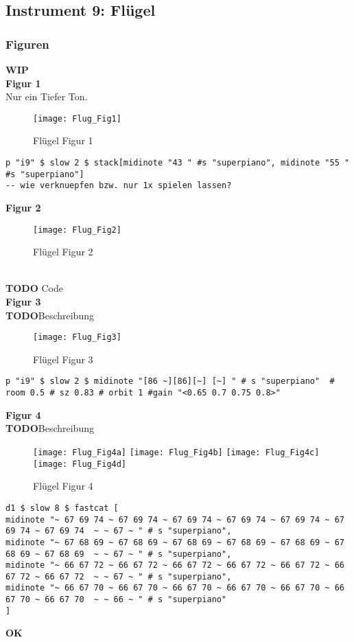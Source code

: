 \documentclass[
10pt, %
a4paper, %
oneside, %
headinclude,footinclude, %
BCOR5mm, %
]{scrartcl}
\begin{document}
\subsection{Instrument 9: Flügel}
\subsubsection{Figuren}
{\color{orange}\textbf{WIP}} \\
\noindent\textbf{Figur 1}\\
Nur ein Tiefer Ton.
\begin{figure}[h]
	\centering 
	\texttt{[image: Flug\_Fig1]} 
	\caption{Flügel Figur 1}
\end{figure}

\begin{lstlisting}
p "i9" $ slow 2 $ stack[midinote "43 " #s "superpiano", midinote "55 " #s "superpiano"]
-- wie verknuepfen bzw. nur 1x spielen lassen?
\end{lstlisting}

\noindent \textbf{Figur 2}\\
\begin{figure}[h]
	\centering 
	\texttt{[image: Flug\_Fig2]} 
	\caption{Flügel Figur 2}
\end{figure}\\
{\color{red}\textbf{TODO}} Code\\


\noindent \textbf{Figur 3}\\
{\color{red}\textbf{TODO}}Beschreibung\\
\begin{figure}[h]
	\centering 
	\texttt{[image: Flug\_Fig3]} 
	\caption{Flügel Figur 3}
\end{figure}
\begin{lstlisting}
p "i9" $ slow 2 $ midinote "[86 ~][86][~] [~] " # s "superpiano"  # room 0.5 # sz 0.83 # orbit 1 #gain "<0.65 0.7 0.75 0.8>"
\end{lstlisting}


\noindent \textbf{Figur 4}\\
{\color{red}\textbf{TODO}}Beschreibung\\
\begin{figure}[h]
	\centering 
	\texttt{[image: Flug\_Fig4a]} 
	\texttt{[image: Flug\_Fig4b]} 
	\texttt{[image: Flug\_Fig4c]} 
	\texttt{[image: Flug\_Fig4d]} 
	\caption{Flügel Figur 4}
\end{figure}
\begin{lstlisting}
d1 $ slow 8 $ fastcat [
midinote "~ 67 69 74 ~ 67 69 74 ~ 67 69 74 ~ 67 69 74 ~ 67 69 74 ~ 67 69 74 ~ 67 69 74  ~ ~ 67 ~ " # s "superpiano",
midinote "~ 67 68 69 ~ 67 68 69 ~ 67 68 69 ~ 67 68 69 ~ 67 68 69 ~ 67 68 69 ~ 67 68 69  ~ ~ 67 ~ " # s "superpiano",
midinote "~ 66 67 72 ~ 66 67 72 ~ 66 67 72 ~ 66 67 72 ~ 66 67 72 ~ 66 67 72 ~ 66 67 72  ~ ~ 67 ~ " # s "superpiano",
midinote "~ 66 67 70 ~ 66 67 70 ~ 66 67 70 ~ 66 67 70 ~ 66 67 70 ~ 66 67 70 ~ 66 67 70  ~ ~ 66 ~ " # s "superpiano"
]
\end{lstlisting}
{\color{green}\textbf{OK}} \\
\end{document}
